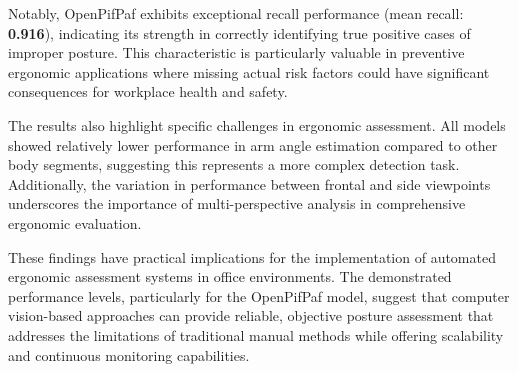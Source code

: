 \documentclass[lettersize,journal]{IEEEtran}
\begin{document}
Notably, OpenPifPaf exhibits exceptional recall performance (mean recall: \textbf{0.916}), indicating its strength in correctly identifying true positive cases of improper posture. This characteristic is particularly valuable in preventive ergonomic applications where missing actual risk factors could have significant consequences for workplace health and safety.

The results also highlight specific challenges in ergonomic assessment. All models showed relatively lower performance in arm angle estimation compared to other body segments, suggesting this represents a more complex detection task. Additionally, the variation in performance between frontal and side viewpoints underscores the importance of multi-perspective analysis in comprehensive ergonomic evaluation.

These findings have practical implications for the implementation of automated ergonomic assessment systems in office environments. The demonstrated performance levels, particularly for the OpenPifPaf model, suggest that computer vision-based approaches can provide reliable, objective posture assessment that addresses the limitations of traditional manual methods while offering scalability and continuous monitoring capabilities.



\end{document}

